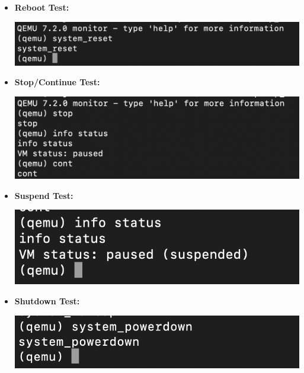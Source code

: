 \begin{itemize}
    \item \textbf{Reboot Test: }
          \begin{center}
              \includegraphics[width=\linewidth]{Images/Rebooting the Guest.png}
              \label{fig:reboot}
          \end{center}
          \noindent
          \mynewline
    \item \textbf{Stop/Continue Test:}
          \begin{center}
              \includegraphics[width=\linewidth]{Images/Stop-Cont 2.png}
              \label{fig:areboot}
          \end{center}

    \item \textbf{Suspend Test:}
          \begin{center}
              \includegraphics[width=\linewidth]{Images/Suspend Guest 2.png}
              \label{fig:areboot}
          \end{center}

    \item \textbf{Shutdown Test:}
          \begin{center}
              \includegraphics[width=\linewidth]{Images/System-powerdown.png}
              \label{fig:areboot}
          \end{center}
\end{itemize}

